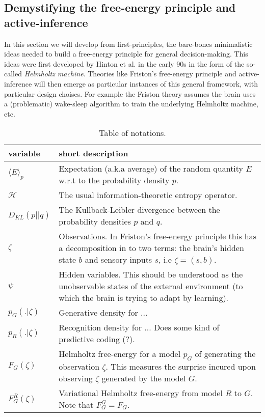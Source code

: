 \documentclass{article} %
\begin{document}
\subsection{Demystifying the free-energy principle and active-inference}
In this section we will develop from first-principles, the bare-bones minimalistic ideas needed to build a free-energy principle for general decision-making. This ideas were first developed by Hinton et al. in the early 90s in the form of the so-called  \textit{Helmholtz machine}. Theories like Friston's free-energy principle and active-inference will then emerge as particular instances of this general framework, with particular design choises. For example the Friston theory assumes the brain uses a (problematic) wake-sleep algorithm to train the underlying Helmholtz machine, etc.
\begin{table}[H]
  \begin{tabular}{p{2cm}|p{11cm}}
         \hline
         \textbf{variable}    & \textbf{short description}  \\ \hline
         $\langle E\rangle_p$ & Expectation (a.k.a average) of the
         random quantity $E$ w.r.t to the probability density $p$.\\ \hline
         $\mathcal H$ & The usual information-theoretic entropy operator.\\ \hline
         $D_{KL}(p||q)$ & The Kullback-Leibler divergence between the probability densities $p$ and $q$. \\ \hline
             $\zeta$ & Observations. In Friston's free-energy principle this has a decomposition in to two terms: the brain's hidden state $b$ and sensory inputs $s$, i.e $\zeta = (s, b).$ \\ \hline
             $\psi$ & Hidden variables. This should be understood as the unobservable states of the external environment (to which the brain is trying to adapt by learning).\\ \hline
             $p_G(.|\zeta)$ & Generative density for ...\\ \hline
         $p_R(.|\zeta)$ & Recognition density for ... Does some kind of predictive coding (?).\\ \hline
         $F_G(\zeta)$ & Helmholtz free-energy for a model $p_G$ of generating the observation $\zeta$. This measures the surprise incured upon observing $\zeta$ generated by the model $G$.\\ \hline
         $F^R_G(\zeta)$ & Variational Helmholtz free-energy from model $R$
         to $G$.  Note that $F^G_G = F_G$.\\ \hline
  \end{tabular}
  \caption{Table of notations.}
\end{table}
\end{document}
